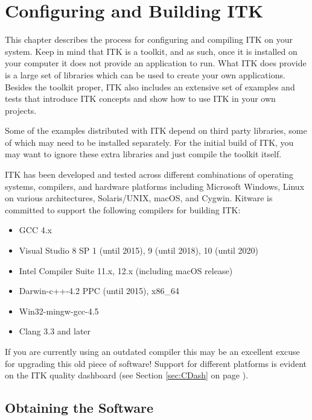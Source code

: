 \chapter{Configuring and Building ITK}
\label{chapter:Installation}

This chapter describes the process for configuring and compiling ITK on your
system. Keep in mind that ITK is a toolkit, and as such, once it is installed
on your computer it does not provide an application to run. What ITK does
provide is a large set of libraries which can be used to create your own
applications. Besides the toolkit proper, ITK also includes an extensive set of
examples and tests that introduce ITK concepts and show how to use ITK in your
own projects.

Some of the examples distributed with ITK depend on third party libraries, some
of which may need to be installed separately. For the initial build of ITK, you
may want to ignore these extra libraries and just compile the toolkit itself.

ITK has been developed and tested across different combinations of operating
systems, compilers, and hardware platforms including Microsoft Windows, Linux on
various architectures, Solaris/UNIX, macOS, and Cygwin. Kitware is committed
to support the following compilers for building ITK:


\begin{itemize}
\item GCC 4.x
\item Visual Studio 8 SP 1 (until 2015), 9 (until 2018), 10 (until 2020)
\item Intel Compiler Suite 11.x, 12.x (including macOS release)
\item Darwin-c++-4.2 PPC (until 2015), x86\_64
\item Win32-mingw-gcc-4.5
\item Clang 3.3 and later
\end{itemize}

If you are currently using an outdated compiler this may be an excellent excuse
for upgrading this old piece of software! Support for different platforms is
evident on the ITK quality dashboard (see Section \ref{sec:CDash} on page
\pageref{sec:CDash}).

\section{Obtaining the Software}
\label{sec:ObtainingTheSoftware}
\label{sec:DownloadingITK}


